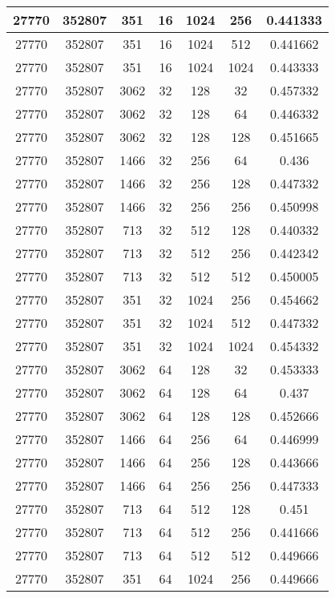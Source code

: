 \documentclass[9pt]{article}
\begin{document}
\begin{tabular}{|c|c|c|c|c|c|c| }
\hline
27770  & 352807  & 351  & 16  & 1024  & 256  & 0.441333 \\
\hline
27770  & 352807  & 351  & 16  & 1024  & 512  & 0.441662 \\
\hline
27770  & 352807  & 351  & 16  & 1024  & 1024  & 0.443333 \\
\hline
27770  & 352807  & 3062  & 32  & 128  & 32  & 0.457332 \\
\hline
27770  & 352807  & 3062  & 32  & 128  & 64  & 0.446332 \\
\hline
27770  & 352807  & 3062  & 32  & 128  & 128  & 0.451665 \\
\hline
27770  & 352807  & 1466  & 32  & 256  & 64  & 0.436 \\
\hline
27770  & 352807  & 1466  & 32  & 256  & 128  & 0.447332 \\
\hline
27770  & 352807  & 1466  & 32  & 256  & 256  & 0.450998 \\
\hline
27770  & 352807  & 713  & 32  & 512  & 128  & 0.440332 \\
\hline
27770  & 352807  & 713  & 32  & 512  & 256  & 0.442342 \\
\hline
27770  & 352807  & 713  & 32  & 512  & 512  & 0.450005 \\
\hline
27770  & 352807  & 351  & 32  & 1024  & 256  & 0.454662 \\
\hline
27770  & 352807  & 351  & 32  & 1024  & 512  & 0.447332 \\
\hline
27770  & 352807  & 351  & 32  & 1024  & 1024  & 0.454332 \\
\hline
27770  & 352807  & 3062  & 64  & 128  & 32  & 0.453333 \\
\hline
27770  & 352807  & 3062  & 64  & 128  & 64  & 0.437 \\
\hline
27770  & 352807  & 3062  & 64  & 128  & 128  & 0.452666 \\
\hline
27770  & 352807  & 1466  & 64  & 256  & 64  & 0.446999 \\
\hline
27770  & 352807  & 1466  & 64  & 256  & 128  & 0.443666 \\
\hline
27770  & 352807  & 1466  & 64  & 256  & 256  & 0.447333 \\
\hline
27770  & 352807  & 713  & 64  & 512  & 128  & 0.451 \\
\hline
27770  & 352807  & 713  & 64  & 512  & 256  & 0.441666 \\
\hline
27770  & 352807  & 713  & 64  & 512  & 512  & 0.449666 \\
\hline
27770  & 352807  & 351  & 64  & 1024  & 256  & 0.449666 \\

\end{tabular}
\end{document}
